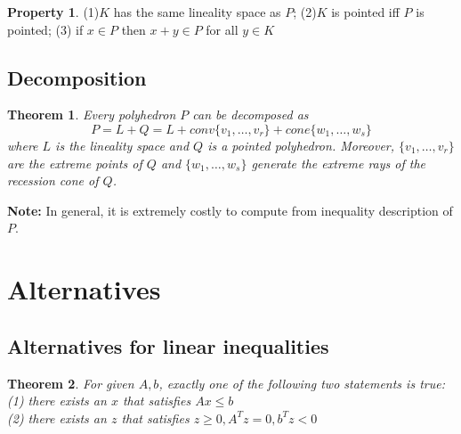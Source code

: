 \documentclass[10pt]{article}
\newtheorem{thm}{Theorem}[section]
\theoremstyle{definition}
\newtheorem{pty}{Property}[section]
\newcommand{\Note}[0]{\noindent\textbf{Note: }}
\begin{document}
\begin{pty}
	(1)$K$ has the same lineality space as $P$; (2)$K$ is pointed iff $P$ is pointed;
	(3) if $x \in P$ then $x + y\in P$ for all $y \in K$
\end{pty}


\subsection{Decomposition}

\begin{thm}
	Every polyhedron $P$ can be decomposed as
	\begin{equation*}
		P = L + Q = L + conv\{v_1, \dots , v_r\} + cone\{w_1, \dots, w_s\}
	\end{equation*}
	where $L$ is the lineality space and $Q$ is a pointed polyhedron.
	Moreover, $\{v_1, \dots , v_r\}$ are the extreme points of $Q$ and
	$\{w_1, \dots, w_s\}$ generate the extreme rays of the recession cone of $Q$.
\end{thm}

\Note In general, it is extremely costly to compute from inequality description of $P$.



\section{Alternatives}

\subsection{Alternatives for linear inequalities}
\begin{thm}
	For given $A, b$, exactly one of the following two statements is true:\\
	(1) there exists an $x$ that satisfies $Ax \le b$\\
	(2) there exists an $z$ that satisfies $z \ge 0, A^Tz = 0, b^Tz < 0$
\end{thm}
\end{document}
